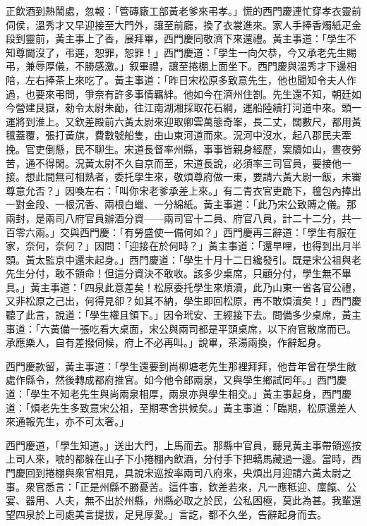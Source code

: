 正飲酒到熱鬧處，忽報：「管磚廠工部黃老爹來弔孝。」慌的西門慶連忙穿孝衣靈前伺侯，溫秀才又早迎接至大門外，讓至前廳，換了衣裳進來。家人手捧香燭紙疋金段到靈前，黃主事上了香，展拜畢，西門慶同敬濟下來還禮。黃主事道：「學生不知尊閫沒了，弔遲，恕罪，恕罪！」西門慶道：「學生一向欠恭，今又承老先生賜弔，兼辱厚儀，不勝感激。」叙畢禮，讓至捲棚上面坐下。西門慶與溫秀才下邊相陪，左右捧茶上來吃了。黃主事道：「昨日宋松原多致意先生，他也聞知令夫人作過，也要來弔問，爭奈有許多事情羈絆。他如今在濟州住劄。先生還不知，朝廷如今營建艮嶽，勑令太尉朱勔，往江南湖湘採取花石綱，運船陸續打河道中來。頭一運將到淮上。又欽差殿前六黃太尉來迎取卿雲萬態奇峯，長二丈，闊數尺，都用黃氊蓋覆，張打黃旗，費數號船隻，由山東河道而來。況河中沒水，起八郡民夫牽挽。官吏倒懸，民不聊生。{}宋道長督率州縣，事事皆親身經歷，案牘如山，晝夜勞苦，通不得閑。況黃太尉不久自京而至，宋道長說，必須率三司官員，要接他一接。想此間無可相熟者，委托學生來，敬煩尊府做一東，要請六黃大尉一飯，未審尊意允否？」因喚左右：「叫你宋老爹承差上來。」有二青衣官吏跪下，氊包內捧出一對金段、一根沉香、兩根白蠟、一分綿紙。黃主事道：「此乃宋公致賻之儀。那兩封，是兩司八府官員辦酒分資——兩司官十二員、府官八員，計二十二分，共一百零六兩。」交與西門慶：「有勞盛使一備何如？」西門慶再三辭道：「學生有服在家，奈何，奈何？」因問：「迎接在於何時？」黃主事道：「還早哩，也得到出月半頭。黃太監京中還未起身。」西門慶道：「學生十月十二日纔發引。既是宋公祖與老先生分付，敢不領命！但這分資決不敢收。該多少桌席，只顧分付，學生無不畢具。」黃主事道：「四泉此意差矣！松原委托學生來煩瀆，此乃山東一省各官公禮，又非松原之己出，何得見卻？如其不納，學生即回松原，再不敢煩瀆矣！」{}西門慶聽了此言，說道：「學生權且領下。」因令玳安、王經接下去。問備多少桌席，黃主事道：「六黃備一張吃看大桌面，宋公與兩司都是平頭桌席，以下府官散席而已。承應樂人，自有差撥伺候，府上不必再叫。」說畢，茶湯兩換，作辭起身。

西門慶款留，黃主事道：「學生還要到尚柳塘老先生那裡拜拜，他昔年曾在學生敝處作縣令，然後轉成都府推官。如今他令郎兩泉，又與學生鄉試同年。」{}西門慶道：「學生不知老先生與尚兩泉相厚，兩泉亦與學生相交。」黃主事起身，西門慶道：「煩老先生多致意宋公祖，至期寒舍拱候矣。」黃主事道：「臨期，松原還差人來通報先生，亦不可太奢。」

西門慶道，「學生知道。」送出大門，上馬而去。那縣中官員，聽見黃主事帶領巡按上司人來，唬的都躲在山子下小捲棚內飲酒，分付手下把轎馬藏過一邊。{}當時，西門慶回到捲棚與衆官相見，具說宋巡按率兩司八府來，央煩出月迎請六黃太尉之事。衆官悉言：「正是州縣不勝憂苦。這件事，欽差若來，凡一應秪迎、廩餼、公宴、器用、人夫，無不出於州縣，州縣必取之於民，公私困極，莫此為甚。我輩還望四泉於上司處美言提拔，足見厚愛。」言訖，都不久坐，告辭起身而去。

